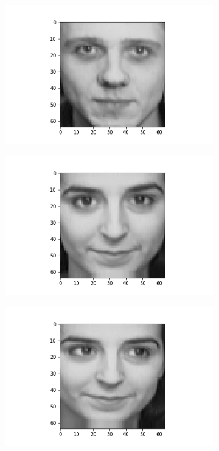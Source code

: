 \documentclass[12pt, a4paper]{article}
\begin{document}
\begin{figure}[h]
    \begin{subfigure}{0.3\linewidth}
        \centering
        \includegraphics[width=\linewidth]{images/q3/c/0/0.png}
    \end{subfigure}
    \hfill
    \begin{subfigure}{0.3\linewidth}
        \centering
        \includegraphics[width=\linewidth]{images/q3/c/0/1.png}
    \end{subfigure}
    \hfill
    \begin{subfigure}{0.3\linewidth}
        \centering
        \includegraphics[width=\linewidth]{images/q3/c/0/2.png}

\end{subfigure}
\end{figure}
\end{document}
